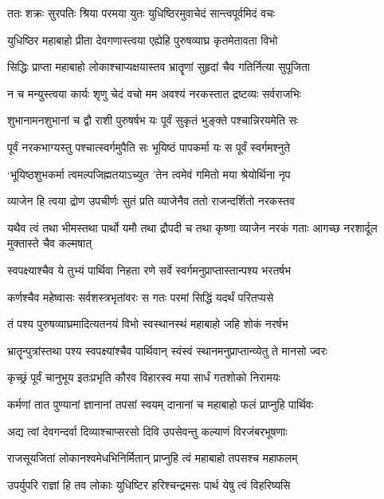 \twolineshloka
{ततः शक्रः सुरपतिः श्रिया परमया युतः}
{युधिष्ठिरमुवाचेदं सान्त्वपूर्वमिदं वचः}


\twolineshloka
{युधिष्ठिर महाबाहो प्रीता देवगणास्त्वया}
{एह्येहि पुरुषव्याघ्र कृतमेतावता विभो}


\twolineshloka
{सिद्धिः प्राप्ता महाबाहो लोकाश्चाप्यक्षयास्तव}
{भ्रातॄणां सुहृदां चैव गतिर्नित्या सुपूजिता}


\twolineshloka
{न च मन्युस्त्वया कार्यः शृणु चेदं वचो मम}
{अवश्यं नरकस्तात द्रष्टव्यः सर्वराजभिः}


\twolineshloka
{शुभानामनशुभानां च द्वौ राशी पुरुषर्षभ}
{यः पूर्वं सुकृतं भुङ्क्ते पश्चान्निरयमेति सः}


\twolineshloka
{पूर्वं नरकभाग्यस्तु पश्चात्स्वर्गमुपैति सः}
{भूयिष्ठं पापकर्मा यः स पूर्वं स्वर्गमश्नुते}


\twolineshloka
{`भूयिष्ठशुभकर्मा त्वमल्पजिह्मतयाऽच्युत}
{'तेन त्वमेवं गमितो मया श्रेयोर्थिना नृप}


\twolineshloka
{व्याजेन हि त्वया द्रोण उपचीर्णः सुतं प्रति}
{व्याजेनैव ततो राजन्दर्शितो नरकस्तव}


\threelineshloka
{यथैव त्वं तथा भीमस्तथा पार्थो यमौ तथा}
{द्रौपदी च तथा कृष्णा व्याजेन नरकं गताः}
{आगच्छ नरशार्दूल मुक्तास्ते चैव कल्मषात्}


\twolineshloka
{स्वपक्ष्याश्चैव ये तुभ्यं पार्थिवा निहता रणे}
{सर्वे स्वर्गमनुप्राप्तास्तान्पश्य भरतर्षभ}


\twolineshloka
{कर्णश्चैव महेष्वासः सर्वशस्त्रभृतांवरः}
{स गतः परमां सिद्धिं यदर्थं परितप्यसे}


\twolineshloka
{तं पश्य पुरुषव्याघ्रमादित्यतनयं विभो}
{स्वस्थानस्थं महाबाहो जहि शोकं नरर्षभ}


\twolineshloka
{भ्रातॄन्पुत्रांस्तथा पश्य स्वपक्ष्यांश्चैव पार्थिवान्}
{स्वंस्वं स्थानमनुप्राप्तान्व्येतु ते मानसो ज्वरः}


\twolineshloka
{कृच्छ्रं पूर्वं चानुभूय इतःप्रभृति कौरव}
{विहारस्व मया सार्धं गतशोको निरामयः}


\twolineshloka
{कर्मणां तात पुण्यानां ज्ञानानां तपसां स्वयम्}
{दानानां च महाबाहो फलं प्राप्नुहि पार्थिवः}


\twolineshloka
{अद्य त्वां देवगन्दर्वा दिव्याश्चाप्सरसो दिवि}
{उपसेवन्तु कल्याणं विरजंबरभूषणाः}


\twolineshloka
{राजसूयजितां लोकानश्वमेधभिनिर्मितान्}
{प्राप्नुहि त्वं महाबाहो तपसश्च महाफलम्}


\twolineshloka
{उपर्युपरि राज्ञां हि तव लोकाः युधिष्टिर}
{हरिश्चन्द्रमसः पार्थ येषु त्वं विहरिष्यसि}


